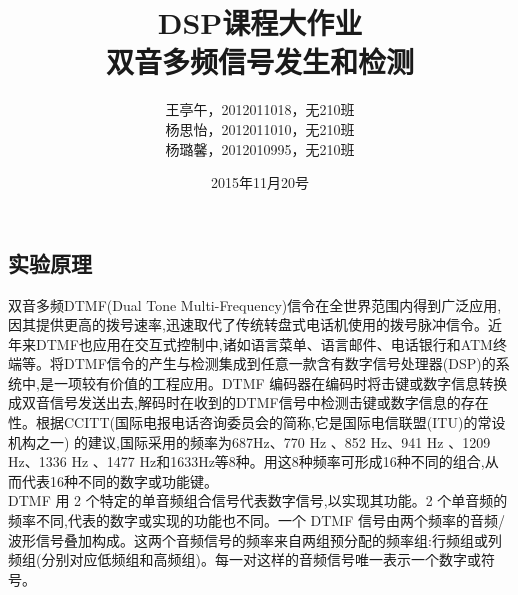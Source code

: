 \documentclass{article}
\begin{document}
\begin{CJK}{UTF8}{gbsn}
\title{DSP课程大作业\\
双音多频信号发生和检测}
\author{王亭午，2012011018，无210班\\
杨思怡，2012011010，无210班\\
杨璐馨，2012010995，无210班
}
\date{2015年11月20号}
\maketitle
\section{实验原理}
双音多频DTMF(Dual Tone Multi-Frequency)信令在全世界范围内得到广泛应用,因其提供更高的拨号速率,迅速取代了传统转盘式电话机使用的拨号脉冲信令。近年来DTMF也应用在交互式控制中,诸如语言菜单、语言邮件、电话银行和ATM终端等。将DTMF信令的产生与检测集成到任意一款含有数字信号处理器(DSP)的系统中,是一项较有价值的工程应用。DTMF 编码器在编码时将击键或数字信息转换成双音信号发送出去,解码时在收到的DTMF信号中检测击键或数字信息的存在性。根据CCITT(国际电报电话咨询委员会的简称,它是国际电信联盟(ITU)的常设机构之一) 的建议,国际采用的频率为687Hz、770 Hz 、852 Hz、941 Hz 、1209 Hz、1336 Hz 、1477 Hz和1633Hz等8种。用这8种频率可形成16种不同的组合,从而代表16种不同的数字或功能键。\\
DTMF 用 2 个特定的单音频组合信号代表数字信号,以实现其功能。2 个单音频的频率不同,代表的数字或实现的功能也不同。一个 DTMF 信号由两个频率的音频/波形信号叠加构成。这两个音频信号的频率来自两组预分配的频率组:行频组或列频组(分别对应低频组和高频组)。每一对这样的音频信号唯一表示一个数字或符号。

\end{CJK}
\end{document}
